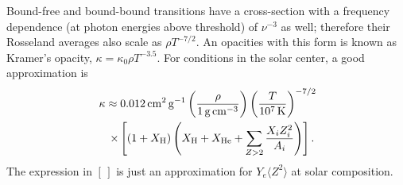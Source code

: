 Bound-free and bound-bound transitions have a cross-section with a frequency dependence (at photon energies above threshold) of $\nu^{-3}$ as well; therefore their Rosseland averages also scale as $\rho T^{-7/2}$.  An opacities with this form is known as {Kramer's opacity}, $\kappa = \kappa_{0}\rho T^{-3.5}$.  For conditions in the solar center, a good approximation is
\begin{eqnarray}
\lefteqn{\kappa \approx 0.012\nsp\cm^{2}\usp\gram^{-1}\left(\frac{\rho}{1\nsp\grampercc}\right) \left(\frac{T}{10^{7}\nsp\K}\right)^{-7/2}} \nonumber\\
&& \times\left[\left(1+X_{\mathrm{H}}\right)\left(X_{\mathrm{H}} + X_{\mathrm{He}} + \sum_{Z>2}\frac{X_{i}Z_{i}^{2}}{A_{i}}\right)\right].
\label{e.kramers-opacity}
\end{eqnarray}
The expression in $[\,]$ is just an approximation for $Y_{e}\langle Z^{2}\rangle$ at solar composition.

